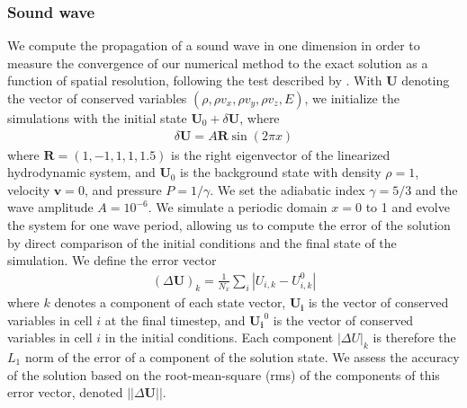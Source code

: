 \documentclass[fleqn,usenatbib]{mnras}
\newcommand{\vc}[1]{{\mathbf{#1}}}
\begin{document}
\subsubsection{Sound wave}
We compute the propagation of a sound wave in one dimension in order to measure the convergence of our numerical method to the exact solution as a function of spatial resolution, following the test described by \cite{Stone_2008}. With $\vc{U}$ denoting the vector of conserved variables $(\rho, \rho v_x, \rho v_y, \rho v_z, E)$, we initialize the simulations with the initial state $\vc{U}_0 + \delta \vc{U}$, where
\begin{align}
\delta \vc{U} = A \vc{R} \sin(2\pi x)
\end{align}
where $\vc{R} = (1,-1,1,1,1.5)$ is the right eigenvector of the linearized hydrodynamic system, and $\vc{U}_0$ is the background state with density $\rho = 1$, velocity $\vc{v} = 0$, and pressure $P = 1/\gamma$. We set the adiabatic index $\gamma = 5/3$ and the wave amplitude $A = 10^{-6}$. We simulate a periodic domain $x= 0$ to 1 and evolve the system for one wave period, allowing us to compute the error of the solution by direct comparison of the initial conditions and the final state of the simulation. We define the error vector
\begin{align}
(\Delta \vc{U})_{k} = \frac{1}{N_x} \sum_{i} \left| U_{i,k} - U_{i,k}^{0} \right|
\label{eq:convergence_error}
\end{align}
where $k$ denotes a component of each state vector, $\vc{U_i}$ is the vector of conserved variables in cell $i$ at the final timestep, and $\vc{U_i}^{0}$ is the vector of conserved variables in cell $i$ in the initial conditions. Each component $|\Delta U|_k$ is therefore the $L_1$ norm of the error of a component of the solution state.  We assess the accuracy of the solution based on the root-mean-square (rms) of the components of this error vector, denoted $||\Delta \vc{U}||$.
\end{document}
